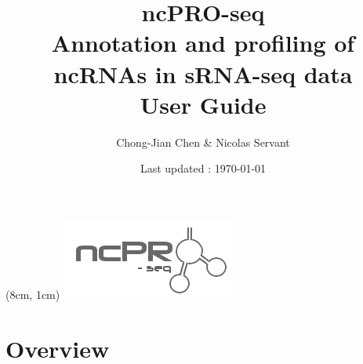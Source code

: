 \documentclass[12pt]{article}
\title{\vspace{7cm}\textbf{ncPRO-seq}\\\normalsize  Annotation and profiling of ncRNAs in sRNA-seq data\\\vspace{1cm}\large{\bf{User Guide}}\\\vspace{1cm} \normalsize \ncpip{}}
\date{\normalsize Last updated : \today}
\author{Chong-Jian Chen \& Nicolas Servant}
\begin{document}
\begin{titlepage}
\begin{center}
\begin{textblock*}{3cm}(8cm, 1cm)
\includegraphics[scale=0.8]{pic/ncPRO_logo.png}
\end{textblock*}
\end{center}
\end{titlepage}

\maketitle
\newpage

\tableofcontents
\clearpage
\section{Overview}
\end{document}
